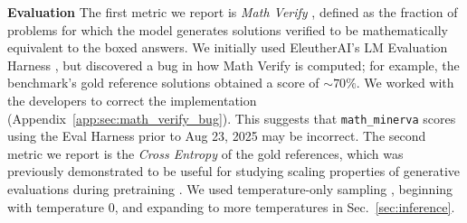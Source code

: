 \textbf{Evaluation} 
The first metric we report is \emph{Math Verify} \citep{kydlicek2025fixing}, defined as the fraction of problems for which the model generates solutions verified to be mathematically equivalent to the boxed answers.
We initially used EleutherAI's LM Evaluation Harness \citep{gao2024evalharness}, but discovered a bug in how Math Verify is computed; for example, the benchmark's gold reference solutions obtained a score of $\mathord{\sim}70\%$.
We worked with the developers to correct the implementation (Appendix~\ref{app:sec:math_verify_bug}).
This suggests that \texttt{math\_minerva} scores using the Eval Harness prior to Aug 23, 2025 may be incorrect.
The second metric we report is the \emph{Cross Entropy} of the gold references, which was previously demonstrated to be useful for studying scaling properties of generative evaluations during pretraining \citep{schaeffer2025pretrainingscalinglawsgenerative}.
We used temperature-only sampling \citep{schaeffer2025minpmaxexaggerationcritical}, beginning with temperature $0$, and expanding to more temperatures in Sec.~\ref{sec:inference}.